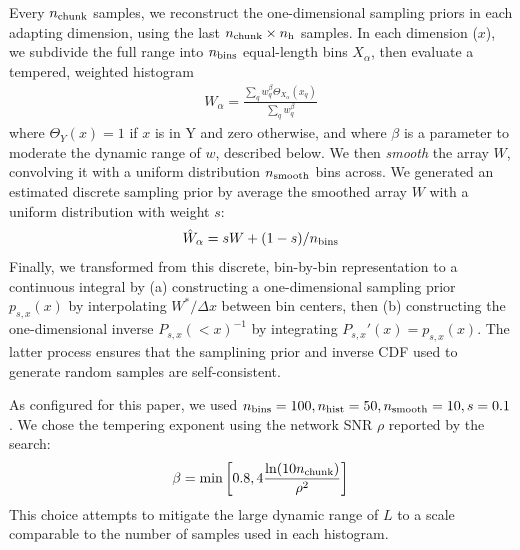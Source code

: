 Every $n_{\rm chunk}$ samples, we reconstruct the one-dimensional sampling priors in each adapting dimension, using
the last $n_{\rm chunk}\times n_{\rm h}$ samples.    In each dimension ($x$), we subdivide the full range
into $n_{\rm bins}$ equal-length bins $X_\alpha$, then evaluate a tempered, weighted histogram
\begin{eqnarray}
W_\alpha = \frac{\sum_{q} w_q^\beta \Theta_{X_\alpha}(x_q)}{\sum_q w_q^\beta}
\end{eqnarray}
where $\Theta_Y(x)=1$ if  $x$ is in Y and zero otherwise,  and where $\beta$ is a  parameter to moderate the dynamic
range of $w$, described below.  
%
We then \emph{smooth} the array $W$, convolving it with a uniform distribution $n_{\rm smooth}$ bins across.
%
We generated an estimated discrete sampling prior by average the smoothed array $W$ with a uniform distribution with weight $s$:
\begin{eqnarray}
\hat{W}_\alpha = s W + (1-s)/n_{\rm bins}
\end{eqnarray}
Finally, we transformed from this discrete, bin-by-bin representation to a continuous integral by (a) constructing
a one-dimensional sampling prior $p_{s,x}(x)$  by interpolating $W^*/\Delta x$ between bin centers, then (b) constructing the
one-dimensional inverse $P_{s,x}(<x)^{-1}$ by integrating $P_{s,x}'(x)=p_{s,x}(x)$.  
%
The latter process ensures that the samplining prior and inverse CDF used to generate random samples are
self-consistent.   
%


As configured for this paper, we used $n_{\rm bins}=100, n_{\rm hist}=50,n_{\rm smooth}=10,s=0.1$.  We chose the
tempering exponent using the network SNR $\rho$ reported by the search:
\begin{eqnarray}
\beta = \text{min} \left[ 0.8, 4 \frac{\ln (10 n_{\rm chunk})}{\rho^2} \right]
\end{eqnarray}
This choice attempts to mitigate the large dynamic range of $L$ to a scale comparable to the number of samples used in
each histogram.  











